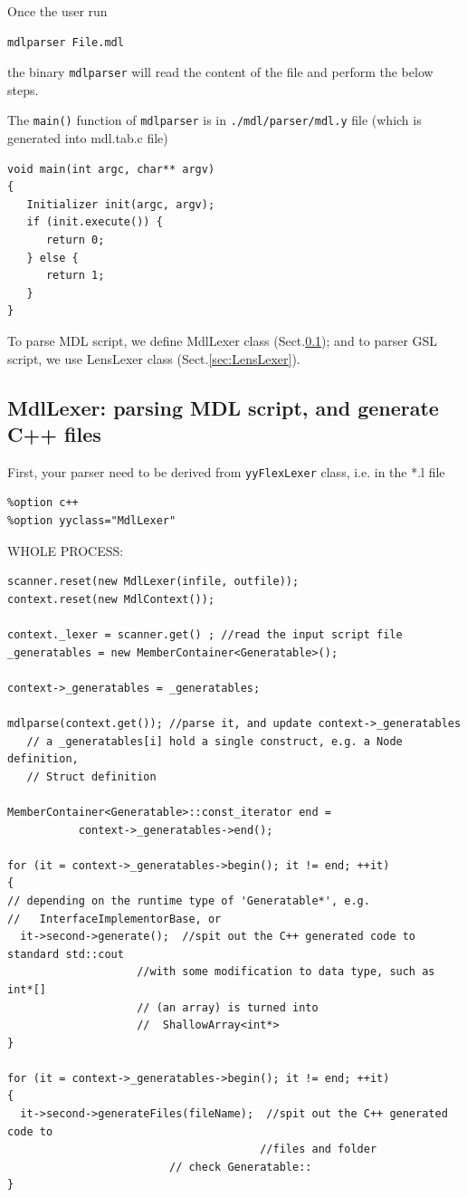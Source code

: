 Once the user run 
\begin{verbatim}
mdlparser File.mdl
\end{verbatim}
the binary \verb!mdlparser! will read the content of the file and perform the
below steps.

The \verb!main()! function of \verb!mdlparser! is in 
\verb!./mdl/parser/mdl.y! file (which is generated into mdl.tab.c file)
\begin{lstlisting}
void main(int argc, char** argv)
{
   Initializer init(argc, argv);
   if (init.execute()) {
      return 0;
   } else {
      return 1;
   }
}
\end{lstlisting}

To parse MDL script, we define MdlLexer class (Sect.\ref{sec:MdlLexer-class});
and to parser GSL script, we use LensLexer class (Sect.\ref{sec:LensLexer}).

\subsection{MdlLexer: parsing MDL script, and generate C++ files}
\label{sec:MdlLexer-class}

First, your parser need to be derived from \verb!yyFlexLexer! class, i.e. in the
*.l file
\begin{verbatim}
%option c++
%option yyclass="MdlLexer"
\end{verbatim} 

WHOLE PROCESS:
\begin{verbatim}
scanner.reset(new MdlLexer(infile, outfile));
context.reset(new MdlContext());

context._lexer = scanner.get() ; //read the input script file
_generatables = new MemberContainer<Generatable>();

context->_generatables = _generatables;

mdlparse(context.get()); //parse it, and update context->_generatables
   // a _generatables[i] hold a single construct, e.g. a Node definition, 
   // Struct definition

MemberContainer<Generatable>::const_iterator end =
           context->_generatables->end();

for (it = context->_generatables->begin(); it != end; ++it)
{
// depending on the runtime type of 'Generatable*', e.g.
//   InterfaceImplementorBase, or 
  it->second->generate();  //spit out the C++ generated code to standard std::cout
                    //with some modification to data type, such as int*[] 
                    // (an array) is turned into
                    //  ShallowArray<int*>
}

for (it = context->_generatables->begin(); it != end; ++it)
{
  it->second->generateFiles(fileName);  //spit out the C++ generated code to
                                       //files and folder
                         // check Generatable::
}
\end{verbatim}

